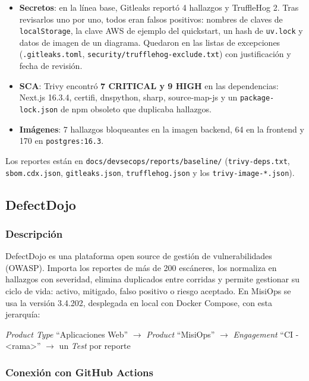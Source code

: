 \begin{itemize}
    \item \textbf{Secretos}: en la línea base, Gitleaks reportó 4 hallazgos y TruffleHog 2. Tras revisarlos uno por uno, todos eran falsos positivos: nombres de claves de \texttt{localStorage}, la clave AWS de ejemplo del quickstart, un hash de \texttt{uv.lock} y datos de imagen de un diagrama. Quedaron en las listas de excepciones (\texttt{.gitleaks.toml}, \texttt{security/trufflehog-exclude.txt}) con justificación y fecha de revisión.
    \item \textbf{SCA}: Trivy encontró \textbf{7 CRITICAL y 9 HIGH} en las dependencias: Next.js 16.3.4, certifi, dnspython, sharp, source-map-js y un \texttt{package-lock.json} de npm obsoleto que duplicaba hallazgos.
    \item \textbf{Imágenes}: 7 hallazgos bloqueantes en la imagen backend, 64 en la frontend y 170 en \texttt{postgres:16.3}.
\end{itemize}

Los reportes están en \texttt{docs/devsecops/reports/baseline/} (\texttt{trivy-deps.txt}, \texttt{sbom.cdx.json}, \texttt{gitleaks.json}, \texttt{trufflehog.json} y los \texttt{trivy-image-*.json}).

\subsection{DefectDojo}

\subsubsection{Descripción}

DefectDojo es una plataforma open source de gestión de vulnerabilidades (OWASP). Importa los reportes de más de 200 escáneres, los normaliza en hallazgos con severidad, elimina duplicados entre corridas y permite gestionar su ciclo de vida: activo, mitigado, falso positivo o riesgo aceptado. En MisiOps se usa la versión 3.4.202, desplegada en local con Docker Compose, con esta jerarquía:

\begin{center}
    \textit{Product Type} ``Aplicaciones Web'' $\rightarrow$ \textit{Product} ``MisiOps'' $\rightarrow$ \textit{Engagement} ``CI - \textless rama\textgreater'' $\rightarrow$ un \textit{Test} por reporte
\end{center}

\subsubsection{Conexión con GitHub Actions}


